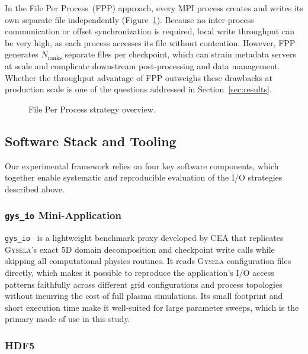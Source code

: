 In the File Per Process~(FPP) approach, every MPI process creates and writes its
own separate file independently (Figure~\ref{fig:fpp_schema}). Because no
inter-process communication or offset synchronization is required, local write
throughput can be very high, as each process accesses its file without contention.
However, FPP generates $N_{\text{ranks}}$ separate files per checkpoint, which can
strain metadata servers at scale and complicate downstream post-processing and data
management. Whether the throughput advantage of FPP outweighs these drawbacks at
production scale is one of the questions addressed in Section~\ref{sec:results}.

\begin{figure}[htbp]
  \centering
  
  \caption{File Per Process strategy overview.}
  \label{fig:fpp_schema}
\end{figure}

\subsection{Software Stack and Tooling}
\label{sec:tools}

Our experimental framework relies on four key software components, which together
enable systematic and reproducible evaluation of the I/O strategies described above.

\subsubsection{\texttt{gys\_io} Mini-Application}
\label{sec:gysio}

\texttt{gys\_io}~\cite{gysela_miniapp_io} is a lightweight benchmark proxy
developed by CEA that replicates \textsc{Gysela}'s exact 5D domain decomposition
and checkpoint write calls while skipping all computational physics routines. It
reads \textsc{Gysela} configuration files directly, which makes it possible to
reproduce the application's I/O access patterns faithfully across different grid
configurations and process topologies without incurring the cost of full plasma
simulations. Its small footprint and short execution time make it well-suited for
large parameter sweeps, which is the primary mode of use in this study.

\subsubsection{HDF5}
\label{sec:hdf5}

